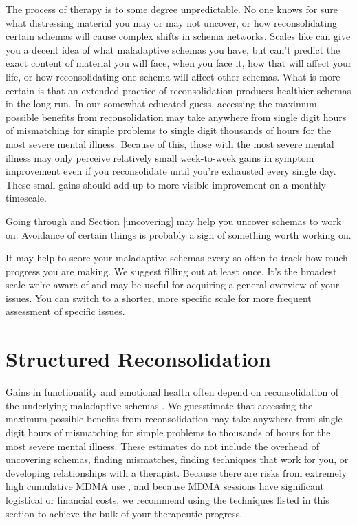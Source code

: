 \documentclass[12pt,letterpaper]{book}
\begin{document}
The process of therapy is to some degree unpredictable. No one knows for sure what distressing material you may or may not uncover, or how reconsolidating certain schemas will cause complex shifts in schema networks. Scales like \textcite{maladaptiveSchemaScale} can give you a decent idea of what maladaptive schemas you have, but can't predict the exact content of material you will face, when you face it, how that will affect your life, or how reconsolidating one schema will affect other schemas. What is more certain is that an extended practice of reconsolidation produces healthier schemas in the long run. In our somewhat educated guess, accessing the maximum possible benefits from reconsolidation may take anywhere from single digit hours of mismatching for simple problems to single digit thousands of hours for the most severe mental illness. Because of this, those with the most severe mental illness may only perceive relatively small week-to-week gains in symptom improvement even if you reconsolidate until you're exhausted every single day. These small gains should add up to more visible improvement on a monthly timescale.

Going through \textcite{maladaptiveSchemaScale} and Section \ref{uncovering} may help you uncover schemas to work on. Avoidance of certain things is probably a sign of something worth working on.

It may help to score your maladaptive schemas every so often to track how much progress you are making. We suggest filling out \textcite{maladaptiveSchemaScale} at least once. It's the broadest scale we're aware of and may be useful for acquiring a general overview of your issues. You can switch to a shorter, more specific scale for more frequent assessment of specific issues.
\section{Structured Reconsolidation}
\label{sec:moreReconsolidation}
Gains in functionality and emotional health often depend on reconsolidation of the underlying maladaptive schemas \cite{eckerUnlocking}. We guesstimate that accessing the maximum possible benefits from reconsolidation may take anywhere from single digit hours of mismatching for simple problems to thousands of hours for the most severe mental illness. These estimates do not include the overhead of uncovering schemas, finding mismatches, finding techniques that work for you, or developing relationships with a therapist. Because there are risks from extremely high cumulative MDMA use \cite{tagen2023valvular}, and because MDMA sessions have significant logistical or financial costs, we recommend using the techniques listed in this section to achieve the bulk of your therapeutic progress.
\end{document}
